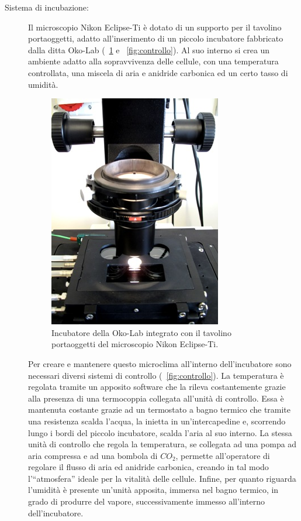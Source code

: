 \begin{description}
\item[Sistema di incubazione:]
Il microscopio Nikon Eclipse-Ti è dotato di un supporto per il tavolino portaoggetti, adatto all'inserimento di un piccolo incubatore fabbricato dalla ditta Oko-Lab (\figurename~\ref{fig:okolab} e \figurename~\ref{fig:controllo}).
Al suo interno si crea un ambiente adatto alla sopravvivenza delle cellule, con una temperatura controllata, una miscela di aria e anidride carbonica ed un certo tasso di umidità.

\begin{figure}
 \centering
 \includegraphics[scale=.40]{img/CAP2okolab.png}
 \caption{\small{Incubatore della Oko-Lab integrato con il tavolino portaoggetti del microscopio Nikon Eclipse-Ti.}}
 \label{fig:okolab}
\end{figure}

Per creare e mantenere questo microclima all'interno dell'incubatore sono necessari diversi sistemi di controllo (\figurename~\ref{fig:controllo}). 
La temperatura è regolata tramite un apposito software che la rileva costantemente grazie alla presenza di una termocoppia collegata all'unità di controllo. 
Essa è mantenuta costante grazie ad un termostato a bagno termico che tramite una resistenza scalda l'acqua, la inietta in un'intercapedine e, scorrendo lungo i bordi del piccolo incubatore, scalda l'aria al suo interno.
La stessa unità di controllo che regola la temperatura, se collegata ad una pompa ad aria compressa e ad una bombola di $CO_2$, permette all'operatore di regolare il flusso di aria ed anidride carbonica, creando in tal modo l'``atmosfera'' ideale per la vitalità delle cellule.
Infine, per quanto riguarda l'umidità è presente un'unità apposita, immersa nel bagno termico, in grado di produrre del vapore, successivamente immesso all'interno dell'incubatore.


\end{description}

